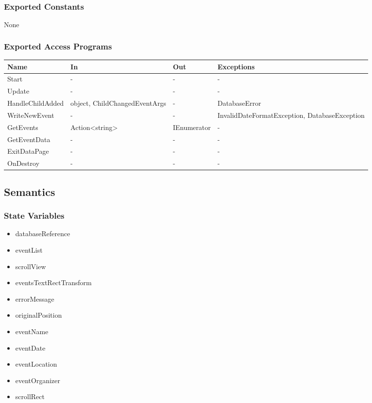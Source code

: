 \documentclass[12pt, titlepage]{article}
\begin{document}
\begin{itemize}
\subsubsection{Exported Constants}
None

\subsubsection{Exported Access Programs}
\begin{center}
\begin{tabular}{p{4cm} p{2cm} p{4cm} p{4cm}}
\hline
\textbf{Name} & \textbf{In} & \textbf{Out} & \textbf{Exceptions} \\
\hline
Start & - & - & - \\
Update & - & - & - \\
HandleChildAdded & object, ChildChangedEventArgs & - & DatabaseError \\
WriteNewEvent & - & - & InvalidDateFormatException, DatabaseException \\
GetEvents & Action<string> & IEnumerator & - \\
GetEventData & - & - & - \\
ExitDataPage & - & - & - \\
OnDestroy & - & - & - \\
\hline
\end{tabular}
\end{center}

\subsection{Semantics}

\subsubsection{State Variables}

\begin{itemize}
\item databaseReference
\item eventList
\item scrollView
\item eventsTextRectTransform
\item errorMessage
\item originalPosition
\item eventName
\item eventDate
\item eventLocation
\item eventOrganizer
\item scrollRect
\end{itemize}


\end{itemize}
\end{document}
